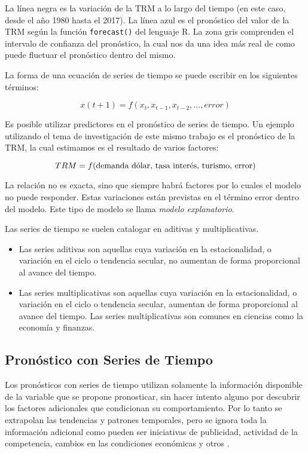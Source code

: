 \begin{spacing}{1.5}
La línea negra es la variación de la TRM a lo largo del tiempo (en este caso, desde el año 1980 hasta el 2017). La línea azul es el pronóstico del valor de la TRM según la función \texttt{forecast()} del lenguaje R. La zona gris comprenden el intervalo de confianza del pronóstico, la cual nos da una idea más real de como puede fluctuar el pronóstico dentro del mismo.

La forma de una ecuación de series de tiempo se puede escribir en los siguientes términos:

\[ x(t+1) = f(x_t, x_{t-1}, x_{t-2}, \ldots, error) \]

Es posible utilizar predictores en el pronóstico de series de tiempo. Un ejemplo utilizando el tema de investigación de este mismo trabajo es el pronóstico de la TRM, la cual estimamos es el resultado de varios factores:

\[ TRM = f(\textnormal{demanda dólar, tasa interés, turismo, error}) \]

La relación no es exacta, sino que siempre habrá factores por lo cuales el modelo no puede responder. Estas variaciones están previstas en el término error dentro del modelo. Este tipo de modelo se llama \emph{modelo explanatorio}. 

Las series de tiempo se suelen catalogar en aditivas y multiplicativas. 

\begin{itemize}
	\item Las series aditivas son aquellas cuya variación en la estacionalidad, o variación en el ciclo o tendencia secular, no aumentan de forma proporcional al avance del tiempo.
	\item Las series multiplicativas son aquellas cuya variación en la estacionalidad, o variación en el ciclo o tendencia secular, aumentan de forma proporcional al avance del tiempo. Las series multiplicativas son comunes en ciencias como la economía y finanzas.
\end{itemize}

\subsection{Pronóstico con Series de Tiempo}
Los pronósticos con series de tiempo utilizan solamente la información disponible de la variable que se propone pronosticar, sin hacer intento alguno por descubrir los factores adicionales que condicionan su comportamiento. Por lo tanto se extrapolan las tendencias y patrones temporales, pero se ignora toda la información adicional como pueden ser iniciativas de publicidad, actividad de la competencia, cambios en las condiciones económicas y otros \cite{hyndman}.


\end{spacing}
